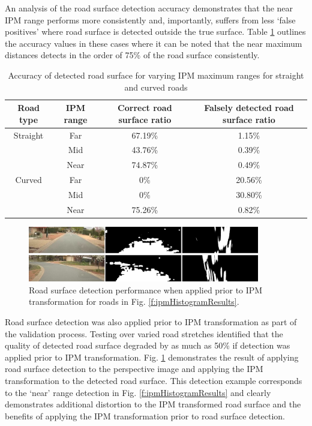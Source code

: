 \documentclass[]{aiaa-tc}%
\begin{document}
An analysis of the road surface detection accuracy demonstrates that the near IPM range performs more consistently and, importantly, suffers from less `false positives' where road surface is detected outside the true surface. Table \ref{t:ipmRangeRoadSurface} outlines the accuracy values in these cases where it can be noted that the near maximum distances detects in the order of 75\% of the road surface consistently. 


\begin{table}[]
	\centering
	\begin{tabular}{@{}cccc@{}}
		\toprule
		Road type & IPM range & Correct road surface ratio & Falsely detected road surface ratio \\ \midrule
		Straight  & Far       & 67.19\%                   & 1.15\%                             \\
		& Mid       & 43.76\%                   & 0.39\%                             \\
		& Near      & 74.87\%                   & 0.49\%                             \\
		Curved    & Far       & 0\%                        & 20.56\%                            \\
		& Mid       & 0\%                        & 30.80\%                            \\
		& Near      & 75.26\%                   & 0.82\%                             \\ \bottomrule
	\end{tabular}
	\caption{Accuracy of detected road surface for varying IPM maximum ranges for straight and curved roads}
	\label{t:ipmRangeRoadSurface}
\end{table}


\begin{figure}[h!]{}
	\centering
	\includegraphics[width=0.9\textwidth]{Results/ipmHistorgramReverse.png}
	\caption{Road surface detection performance when applied prior to IPM transformation for roads in Fig. \ref{f:ipmHistogramResults}.}
	\label{f:ipmHistorgramReverse}
\end{figure}


Road surface detection was also applied prior to IPM transformation as part of the validation process. Testing over varied road stretches identified that the quality of detected road surface degraded by as much as 50\% if detection was applied prior to IPM transformation. Fig. \ref{f:ipmHistorgramReverse} demonstrates the result of applying road surface detection to the perspective image and applying the IPM transformation to the detected road surface. This detection example corresponds to the `near' range detection in Fig. \ref{f:ipmHistogramResults} and clearly demonstrates additional distortion to the IPM transformed road surface and the benefits of applying the IPM transformation prior to road surface detection.
\end{document}
